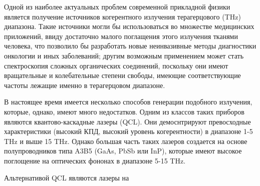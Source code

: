 
Одной из наиболее актуальных проблем современной прикладной физики является
получение источников когерентного излучения терагерцового (THz) диапазона. Такие
источники могли бы использоваться во множестве медицинских приложений, ввиду достаточно 
малого поглащения этого излучения тканями человека, что позволило бы разработать 
новые неинвазивные методы диагностики онкологии и иных заболеваний; другим возможным 
применением может стать спектроскопия сложных органических соединений, поскольку 
они имеют вращательные и колебательные степени свободы, имеющие соответствующие частоты 
лежащие именно в терагерцовом диапазоне.

В настоящее время имеется несколько способов генерации подобного излучения, которые, однако, 
имеют много недостатков. Одним из классов таких приборов являются квантово-каскадные лазеры (QCL).
Они демоснтрируют превосходные характеристики (высокий КПД, высокий уровень когерентности)
в диапазоне 1-5 THz и выше 15 THz. Однако большая часть таких лазеров создается на основе 
полупроводников типа A3B5 (GaAs, PbSb или InP), которые имеют высокое поглощение на оптических 
фононах в диапазоне 5-15 THz.

Альтернативой QCL являются лазеры на 



